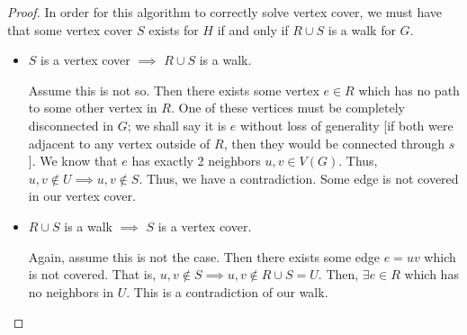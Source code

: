 \documentclass{article}
\begin{document}
\begin{proof}
    In order for this algorithm to correctly solve vertex cover, we must have that some vertex cover $S$ exists for $H$ if and only if $R \cup S$ is a walk for $G$.
    \begin{itemize}
        \item $S$ is a vertex cover $\implies$ $R \cup S$ is a walk.

        Assume this is not so.
        Then there exists some vertex $e \in R$ which has no path to some other vertex in $R$.
        One of these vertices must be completely disconnected in $G$; we shall say it is $e$ without loss of generality
        [if both were adjacent to any vertex outside of $R$, then they would be connected through $s$].
        We know that $e$ has exactly 2 neighbors $u,v \in V(G)$.
        Thus, $u, v \not\in U \implies u, v \not\in S$.
        Thus, we have a contradiction.
        Some edge is not covered in our vertex cover.

        \item $R \cup S$ is a walk $\implies$ $S$ is a vertex cover.

        Again, assume this is not the case.
        Then there exists some edge $e = uv$ which is not covered.
        That is, $u, v \not\in S \implies u, v \not\in R \cup S = U$.
        Then, $\exists e \in R$ which has no neighbors in $U$.
        This is a contradiction of our walk.
    \end{itemize}
\end{proof}
\end{document}
